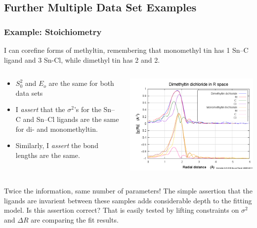 \documentclass[10pt, xcolor=x11names, compress]{beamer}
\begin{document}
\subsection[Examples]{Further Multiple Data Set Examples}
\begin{frame}
  \frametitle{Example: Stoichiometry}

  I can corefine {\color{Green4}forms of methyltin}, remembering that
  monomethyl tin has 1 Sn--C ligand and 3 Sn-Cl, while dimethyl tin
  has 2 and 2.
  \begin{columns}
    \begin{column}{0.55\linewidth}
      \begin{itemize}
      \item $S_0^2$ and $E_o$ are the same for both data sets
      \item I \textit{assert} that the $\sigma^2$'s for the Sn--C and
        Sn--Cl ligands are the same for di- and monomethyltin.
      \item Similarly, I \textit{assert} the bond lengths are the
        same.
      \end{itemize}
    \end{column}
    \begin{column}{0.45\linewidth}
      \includegraphics[width=\linewidth]{mds/methyltin.png}
    \end{column}
  \end{columns}
  \begin{exampleblock}{Twice the information, same number of parameters!}
    The simple assertion that the ligands are invarient between these
    samples adds considerable depth to the fitting model.  Is this
    assertion correct?  That is easily tested by lifting constraints
    on $\sigma^2$ and $\Delta R$ are comparing the fit results.
  \end{exampleblock}
\end{frame}
\end{document}
